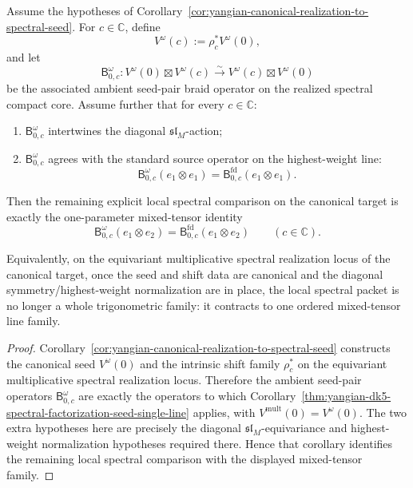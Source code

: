 \begin{corollary}
\label{cor:yangian-canonical-realization-to-single-line}
Assume the hypotheses of
Corollary~\ref{cor:yangian-canonical-realization-to-spectral-seed}.
For \(c\in\mathbb C\), define
\[
V^\omega(c):=\rho_c^*V^\omega(0),
\]
and let
\[
\mathsf B_{0,c}^{\omega}\colon
V^\omega(0)\boxtimes V^\omega(c)
\xrightarrow{\sim}
V^\omega(c)\boxtimes V^\omega(0)
\]
be the associated ambient seed-pair braid operator on the realized
spectral compact core. Assume further that for every \(c\in\mathbb C\):
\begin{enumerate}[label=\textup{(\roman*)}]
\item \(\mathsf B_{0,c}^{\omega}\) intertwines the diagonal
 \(\mathfrak{sl}_M\)-action;
\item \(\mathsf B_{0,c}^{\omega}\) agrees with the standard source
 operator on the highest-weight line:
 \[
 \mathsf B_{0,c}^{\omega}(e_1\otimes e_1)
 =
 \mathsf B_{0,c}^{\mathrm{fd}}(e_1\otimes e_1).
 \]
\end{enumerate}
Then the remaining explicit local spectral comparison on the canonical
target is exactly the one-parameter mixed-tensor identity
\[
\mathsf B_{0,c}^{\omega}(e_1\otimes e_2)
=
\mathsf B_{0,c}^{\mathrm{fd}}(e_1\otimes e_2)
\qquad (c\in\mathbb C).
\]

Equivalently, on the equivariant multiplicative spectral realization
locus of the canonical target, once the seed and shift data are
canonical and the diagonal symmetry/highest-weight normalization are in
place, the local spectral packet is no longer a whole trigonometric
family: it contracts to one ordered mixed-tensor line family.
\end{corollary}

\begin{proof}
Corollary~\ref{cor:yangian-canonical-realization-to-spectral-seed}
constructs the canonical seed \(V^\omega(0)\) and the intrinsic shift
family \(\rho_c^*\) on the equivariant multiplicative spectral
realization locus. Therefore the ambient seed-pair operators
\(\mathsf B_{0,c}^{\omega}\) are exactly the operators to which
Corollary~\ref{thm:yangian-dk5-spectral-factorization-seed-single-line}
applies, with \(V^{\mathrm{mult}}(0)=V^\omega(0)\). The two extra
hypotheses here are precisely the diagonal
\(\mathfrak{sl}_M\)-equivariance and highest-weight normalization
hypotheses required there. Hence that corollary identifies the
remaining local spectral comparison with the displayed mixed-tensor
family.
\end{proof}

